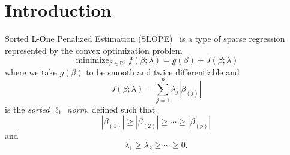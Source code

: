 \section{Introduction}\label{sec:introduction}

Sorted L-One Penalized Estimation (SLOPE)~\cite{bogdan2013,bogdan2015} is a
type of sparse regression represented by the convex optimization problem
\begin{equation}
  \label{eq:slope-problem}
  \operatorname{minimize}_{\beta \in \mathbb{R}^p}
  f(\beta; \lambda) = g(\beta) + J(\beta;\lambda)
\end{equation}
where we take \(g(\beta)\) to be smooth and twice differentiable and
\begin{equation}
  \label{eq:sortedl-l1-norm}
  J(\beta; \lambda) = \sum_{j=1}^p \lambda_j|\beta_{(j)}|
\end{equation}
is the \emph{sorted \(\ell_1\) norm}, defined such that
\[
  |\beta_{(1)}| \geq |\beta_{(2)}| \geq \cdots \geq |\beta_{(p)}|
\]
and
\[
  \lambda_1 \geq \lambda_2 \geq \cdots \geq 0.
\]
